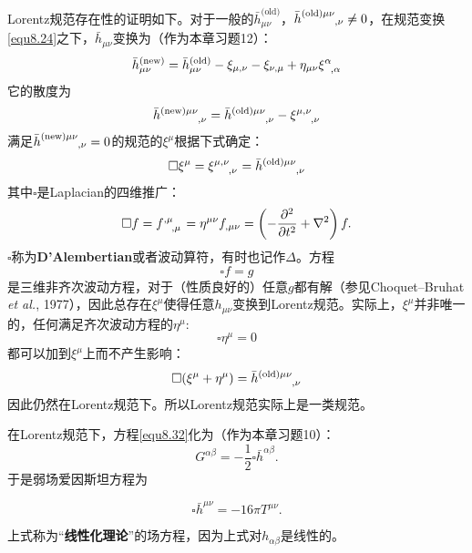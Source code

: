 Lorentz规范存在性的证明如下。对于一般的$\bar{h}^{\text{(old)}}_{\mu \nu}$，$\bar{h}\indices{^{\text{(old)} \mu \nu}_{, \nu}} \neq 0$，在规范变换\eqref{equ8.24}之下，$\bar{h}_{\mu \nu}$变换为（作为本章习题12）：
\begin{equation}
    \bar{h}^{\text{(new)}}_{\mu \nu} = \bar{h}^{\text{(old)}}_{\mu \nu} - \xi_{\mu, \nu} - \xi_{\nu, \mu} + \eta_{\mu \nu} \xi\indices{^\alpha_{, \alpha}} \label{equ8.34}
\end{equation}
它的散度为
\begin{equation}
    \bar{h}\indices{^{\text{(new)} \mu \nu}_{, \nu}} = \bar{h}\indices{^{\text{(old)} \mu \nu}_{, \nu}} - \xi\indices{^{\mu, \nu}_{, \nu}} \label{equ8.35}
\end{equation}
满足$\bar{h}\indices{^{\text{(new)} \mu \nu}_{, \nu}} = 0$的规范的$\xi^\mu$根据下式确定：
\begin{equation}
    \square \xi^\mu = \xi\indices{^{\mu, \nu}_{, \nu}} = \bar{h}\indices{^{\text{(old)} \mu \nu}_{, \nu}} \label{equ8.36}
\end{equation}
其中$\square$是Laplacian的四维推广：
\begin{equation}
    \square f = f\indices{^{, \mu}_{, \mu}} = \eta^{\mu \nu} f_{, \mu \nu} = \left( -\frac{\partial^2}{\partial t^2} + \nabla^2 \right) f. \label{equ8.37}
\end{equation}
$\square$称为\textbf{D'Alembertian}或者波动算符，有时也记作$\Delta$。方程
\begin{equation}
    \square f = g \label{equ8.38}
\end{equation}
是三维非齐次波动方程，对于（性质良好的）任意$g$都有解（参见Choquet–Bruhat \textit{et al.}, 1977），因此总存在$\xi^\mu$使得任意$h_{\mu \nu}$变换到Lorentz规范。实际上，$\xi^\mu$并非唯一的，任何满足齐次波动方程的$\eta^\mu$:
\begin{equation}
    \square \eta^\mu = 0 \label{equ8.39}
\end{equation}
都可以加到$\xi^\mu$上而不产生影响：
\begin{equation}
    \square (\xi^\mu + \eta^\mu) = \bar{h}\indices{^{\text{(old)} \mu \nu}_{, \nu}} \label{equ8.40}
\end{equation}
因此仍然在Lorentz规范下。所以Lorentz规范实际上是一类规范。

在Lorentz规范下，方程\eqref{equ8.32}化为（作为本章习题10）：
\begin{equation}
    G^{\alpha \beta} = -\frac{1}{2} \square \bar{h}^{\alpha \beta}. \label{equ8.41}
\end{equation}
于是弱场爱因斯坦方程为
\begin{shaded}
\begin{equation}
    \square \bar{h}^{\mu \nu} = -16 \pi T^{\mu \nu}. \label{equ8.42}
\end{equation}
\end{shaded}
上式称为“\textbf{线性化理论}”的场方程，因为上式对$h_{\alpha \beta}$是线性的。



